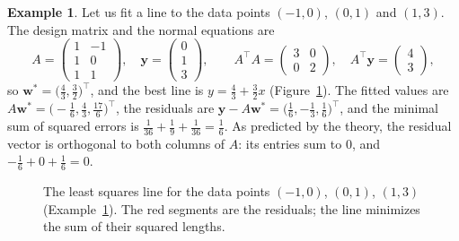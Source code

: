 \documentclass[11pt]{article}
\theoremstyle{definition}
\newtheorem{example}[definition]{Example}
\theoremstyle{plain}
\theoremstyle{remark}
\begin{document}
\begin{example}\label{ex:regression}
    Let us fit a line to the data points $(-1, 0)$, $(0, 1)$ and $(1, 3)$. The design matrix and the normal equations are
    \[A = \begin{pmatrix} 1 & -1 \\ 1 & 0 \\ 1 & 1 \end{pmatrix}, \quad \mathbf{y} = \begin{pmatrix} 0 \\ 1 \\ 3 \end{pmatrix}, \qquad A^\top A = \begin{pmatrix} 3 & 0 \\ 0 & 2 \end{pmatrix}, \quad A^\top \mathbf{y} = \begin{pmatrix} 4 \\ 3 \end{pmatrix},\]
    so $\mathbf{w}^* = \big(\frac{4}{3}, \frac{3}{2}\big)^\top$, and the best line is $y =\frac{4}{3} + \frac{3}{2} x$ (Figure~\ref{fig:regression}). The fitted values are $A\mathbf{w}^* = \big(-\frac{1}{6}, \frac{4}{3}, \frac{17}{6}\big)^\top$, the residuals are $\mathbf{y} - A\mathbf{w}^* = \big(\frac{1}{6}, -\frac{1}{3}, \frac{1}{6}\big)^\top$, and the minimal sum of squared errors is $\frac{1}{36} + \frac{1}{9} + \frac{1}{36} = \frac{1}{6}$. As predicted by the theory, the residual vector is orthogonal to both columns of $A$: its entries sum to $0$, and $-\frac{1}{6} + 0 + \frac{1}{6} = 0$.
\end{example}

\begin{figure}[ht]
    \centering
    \caption[Least squares regression]{The least squares line for the data points $(-1, 0)$, $(0, 1)$, $(1, 3)$ (Example~\ref{ex:regression}). The red segments are the residuals; the line minimizes the sum of their squared lengths.}
    \label{fig:regression}
\end{figure}
\end{document}
